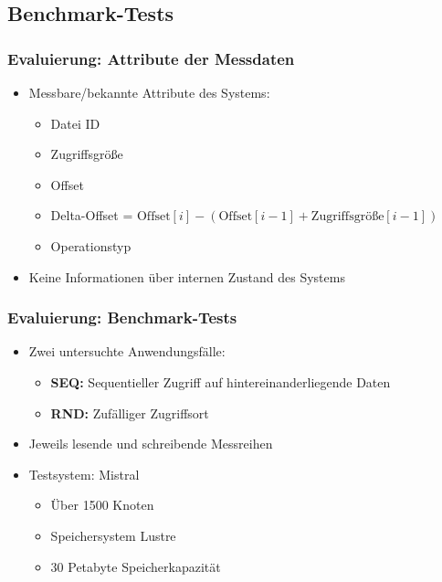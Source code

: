 \documentclass{beamer}
\begin{document}
\subsection{Benchmark-Tests}
\begin{frame}
\frametitle{Evaluierung: Attribute der Messdaten}
	\begin{itemize}
		\item Messbare/bekannte Attribute des Systems:
		\begin{itemize}
			\item Datei ID
			\item Zugriffsgröße
			\item Offset
			\item Delta-Offset = $\text{Offset}[i]-(\text{Offset}[i-1]+\text{Zugriffsgröße}[i-1])$
			\item Operationstyp 
		\end{itemize}
		\item Keine Informationen über internen Zustand des Systems
	\end{itemize}
\end{frame}

\begin{frame}
\frametitle{Evaluierung: Benchmark-Tests}
\begin{itemize}
	\item Zwei untersuchte Anwendungsfälle:
	\begin{itemize}
		\item \textbf{SEQ:} Sequentieller Zugriff auf hintereinanderliegende Daten
		\item \textbf{RND:} Zufälliger Zugriffsort 
	\end{itemize}
	\item Jeweils lesende und schreibende Messreihen
	\item Testsystem: Mistral
	\begin{itemize}
		\item Über 1500 Knoten
		\item Speichersystem Lustre
		\item 30 Petabyte Speicherkapazität
	\end{itemize}
\end{itemize}
\end{frame}
\end{document}
